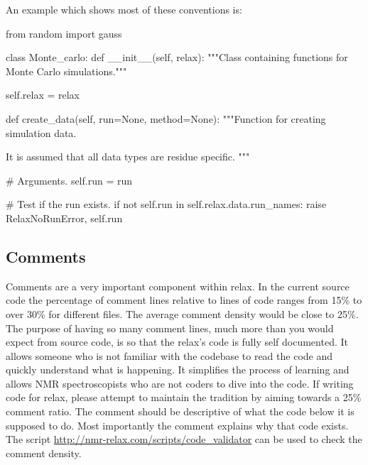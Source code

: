 An example which shows most of these conventions is:
\begin{footnotesize}
\begin{verbatim*}
from random import gauss


class Monte_carlo:
    def __init__(self, relax):
        """Class containing functions for Monte Carlo simulations."""

        self.relax = relax


    def create_data(self, run=None, method=None):
        """Function for creating simulation data.

        It is assumed that all data types are residue specific.
        """

        # Arguments.
        self.run = run

        # Test if the run exists.
        if not self.run in self.relax.data.run_names:
            raise RelaxNoRunError, self.run
\end{verbatim*}
\end{footnotesize}



\subsection{Comments}

Comments are a very important component within relax.  In the current source code the percentage of comment lines relative to lines of code ranges from 15\% to over 30\% for different files.  The average comment density would be close to 25\%.  The purpose of having so many comment lines, much more than you would expect from source code, is so that the relax's code is fully self documented.  It allows someone who is not familiar with the codebase to read the code and quickly understand what is happening.  It simplifies the process of learning and allows NMR spectroscopists who are not coders to dive into the code.  If writing code for relax, please attempt to maintain the tradition by aiming towards a 25\% comment ratio.  The comment should be descriptive of what the code below it is supposed to do.  Most importantly the comment explains why that code exists.  The script \href{http://nmr-relax.com/scripts/code\_validator}{http://nmr-relax.com/scripts/code\_validator} can be used to check the comment density.




